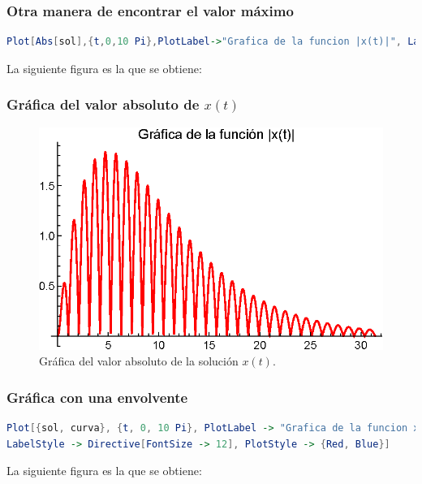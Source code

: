 \begin{frame}[fragile]
\frametitle{Otra manera de encontrar el valor máximo}
\begin{lstlisting}[language=Mathematica]
Plot[Abs[sol],{t,0,10 Pi},PlotLabel->"Grafica de la funcion |x(t)|", LabelStyle->Directive[FontSize->12],PlotStyle->{Red}]
\end{lstlisting}
La siguiente figura es la que se obtiene:
\end{frame}
\begin{frame}
\frametitle{Gráfica del valor absoluto de $x(t)$}
\begin{figure}[H]
    \centering
    \includegraphics[scale=1]{Imagenes/Ejemplo_Resonancia_02.eps}
    \caption{Gráfica del valor absoluto de la solución $x(t)$.}
\end{figure}
\end{frame}
\begin{frame}[fragile]
\frametitle{Gráfica con una envolvente}
\begin{lstlisting}[language=Mathematica]
Plot[{sol, curva}, {t, 0, 10 Pi}, PlotLabel -> "Grafica de la funcion x(t) y una envolvente", 
LabelStyle -> Directive[FontSize -> 12], PlotStyle -> {Red, Blue}]
\end{lstlisting}
La siguiente figura es la que se obtiene:
\end{frame}
